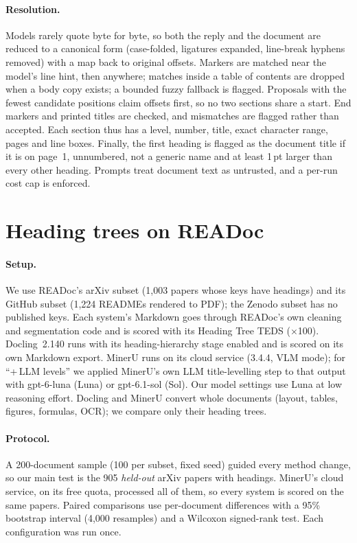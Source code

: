 \documentclass[10pt,twocolumn,letterpaper]{article}
\begin{document}
\paragraph{Resolution.} Models rarely quote byte for byte, so both the reply and the document are
reduced to a canonical form (case-folded, ligatures expanded, line-break hyphens removed) with a map
back to original offsets. Markers are matched near the model's line hint, then anywhere; matches
inside a table of contents are dropped when a body copy exists; a bounded fuzzy fallback is flagged.
Proposals with the fewest candidate positions claim offsets first, so no two sections share a start.
End markers and printed titles are checked, and mismatches are flagged rather than accepted. Each
section thus has a level, number, title, exact character range, pages and line boxes. Finally, the
first heading is flagged as the document title if it is on page~1, unnumbered, not a generic name
and at least 1\,pt larger than every other heading. Prompts treat document text as untrusted, and a
per-run cost cap is enforced.

\section{Heading trees on READoc}
\label{sec:readoc}

\paragraph{Setup.} We use READoc's arXiv subset (1,003 papers whose keys have headings) and its
GitHub subset (1,224 READMEs rendered to PDF); the Zenodo subset has no published keys. Each system's
Markdown goes through READoc's own cleaning and segmentation code and is scored with its Heading Tree
TEDS ($\times$100). Docling~2.140 runs with its heading-hierarchy stage enabled and is scored on its
own Markdown export. MinerU runs on its cloud service (3.4.4, VLM mode); for ``+\,LLM levels'' we
applied MinerU's own LLM title-levelling step to that output with gpt-6-luna (Luna) or gpt-6.1-sol
(Sol). Our model settings use Luna at low reasoning effort. Docling and MinerU convert whole
documents (layout, tables, figures, formulas, OCR); we compare only their heading trees.

\paragraph{Protocol.} A 200-document sample (100 per subset, fixed seed) guided every method change,
so our main test is the 905 \emph{held-out} arXiv papers with headings. MinerU's cloud service, on its
free quota, processed all of them, so every system is scored on the same papers. Paired comparisons use per-document
differences with a 95\% bootstrap interval (4,000 resamples) and a Wilcoxon signed-rank test. Each
configuration was run once.
\end{document}
